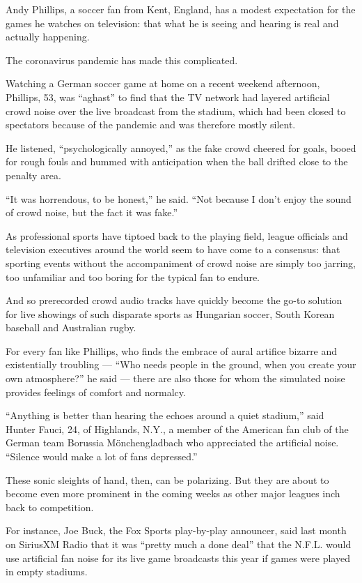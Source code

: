 Andy Phillips, a soccer fan from Kent, England, has a modest expectation
for the games he watches on television: that what he is seeing and
hearing is real and actually happening.

The coronavirus pandemic has made this complicated.

Watching a German soccer game at home on a recent weekend afternoon,
Phillips, 53, was ``aghast'' to find that the TV network had layered
artificial crowd noise over the live broadcast from the stadium, which
had been closed to spectators because of the pandemic and was therefore
mostly silent.

He listened, ``psychologically annoyed,'' as the fake crowd cheered for
goals, booed for rough fouls and hummed with anticipation when the ball
drifted close to the penalty area.

``It was horrendous, to be honest,'' he said. ``Not because I don't
enjoy the sound of crowd noise, but the fact it was fake.''

As professional sports have tiptoed back to the playing field, league
officials and television executives around the world seem to have come
to a consensus: that sporting events without the accompaniment of crowd
noise are simply too jarring, too unfamiliar and too boring for the
typical fan to endure.

And so prerecorded crowd audio tracks have quickly become the go-to
solution for live showings of such disparate sports as Hungarian soccer,
South Korean baseball and Australian rugby.

For every fan like Phillips, who finds the embrace of aural artifice
bizarre and existentially troubling --- ``Who needs people in the
ground, when you create your own atmosphere?'' he said --- there are
also those for whom the simulated noise provides feelings of comfort and
normalcy.

``Anything is better than hearing the echoes around a quiet stadium,''
said Hunter Fauci, 24, of Highlands, N.Y., a member of the American fan
club of the German team Borussia Mönchengladbach who appreciated the
artificial noise. ``Silence would make a lot of fans depressed.''

These sonic sleights of hand, then, can be polarizing. But they are
about to become even more prominent in the coming weeks as other major
leagues inch back to competition.

For instance, Joe Buck, the Fox Sports play-by-play announcer, said last
month on SiriusXM Radio that it was ``pretty much a done deal'' that the
N.F.L. would use artificial fan noise for its live game broadcasts this
year if games were played in empty stadiums.

